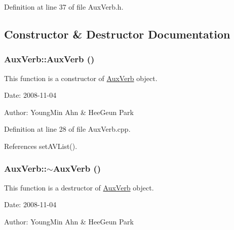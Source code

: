 Definition at line 37 of file AuxVerb.h.

\subsection{Constructor \& Destructor Documentation}
\hypertarget{classkmaOrange_1_1AuxVerb_6ecc7657f31bf369345acce2b227aa73}{
\subsubsection[{AuxVerb}]{\setlength{\rightskip}{0pt plus 5cm}AuxVerb::AuxVerb ()}}
\label{classkmaOrange_1_1AuxVerb_6ecc7657f31bf369345acce2b227aa73}


This function is a constructor of \hyperlink{classkmaOrange_1_1AuxVerb}{AuxVerb} object. 

\begin{Desc}
\item[Date:]2008-11-04 \end{Desc}
\begin{Desc}
\item[Author:]YoungMin Ahn \& HeeGeun Park \end{Desc}


Definition at line 28 of file AuxVerb.cpp.

References setAVList().\hypertarget{classkmaOrange_1_1AuxVerb_ed72d211dc28805844b0272cd80604e7}{
\subsubsection[{$\sim$AuxVerb}]{\setlength{\rightskip}{0pt plus 5cm}AuxVerb::$\sim$AuxVerb ()}}
\label{classkmaOrange_1_1AuxVerb_ed72d211dc28805844b0272cd80604e7}


This function is a destructor of \hyperlink{classkmaOrange_1_1AuxVerb}{AuxVerb} object. 

\begin{Desc}
\item[Date:]2008-11-04 \end{Desc}
\begin{Desc}
\item[Author:]YoungMin Ahn \& HeeGeun Park \end{Desc}


